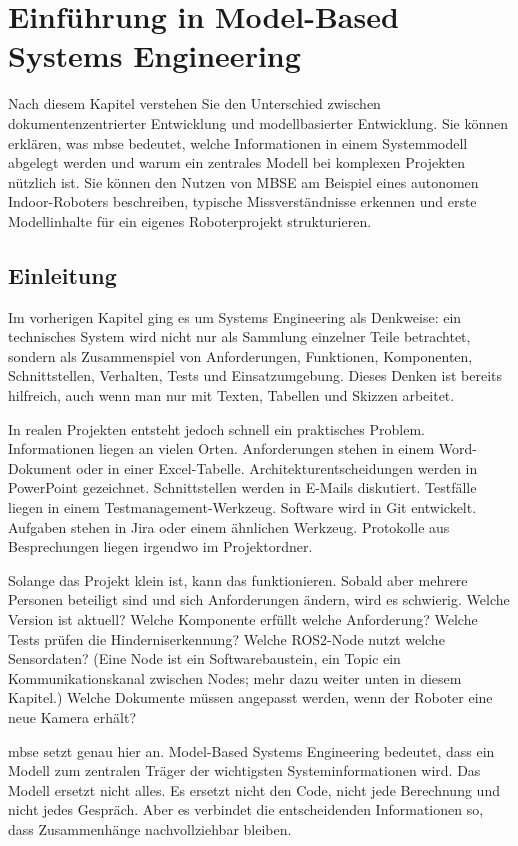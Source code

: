 \chapter{Einführung in Model-Based Systems Engineering}

\begin{lernziele}
Nach diesem Kapitel verstehen Sie den Unterschied zwischen dokumentenzentrierter Entwicklung und modellbasierter Entwicklung. Sie können erklären, was \gls{mbse} bedeutet, welche Informationen in einem Systemmodell abgelegt werden und warum ein zentrales Modell bei komplexen Projekten nützlich ist. Sie können den Nutzen von MBSE am Beispiel eines autonomen Indoor-Roboters beschreiben, typische Missverständnisse erkennen und erste Modellinhalte für ein eigenes Roboterprojekt strukturieren.
\end{lernziele}

\section{Einleitung}
Im vorherigen Kapitel ging es um Systems Engineering als Denkweise: ein technisches System wird nicht nur als Sammlung einzelner Teile betrachtet, sondern als Zusammenspiel von Anforderungen, Funktionen, Komponenten, Schnittstellen, Verhalten, Tests und Einsatzumgebung. Dieses Denken ist bereits hilfreich, auch wenn man nur mit Texten, Tabellen und Skizzen arbeitet.

In realen Projekten entsteht jedoch schnell ein praktisches Problem. Informationen liegen an vielen Orten. Anforderungen stehen in einem Word-Dokument oder in einer Excel-Tabelle. Architekturentscheidungen werden in PowerPoint gezeichnet. Schnittstellen werden in E-Mails diskutiert. Testfälle liegen in einem Testmanagement-Werkzeug. Software wird in Git entwickelt. Aufgaben stehen in Jira oder einem ähnlichen Werkzeug. Protokolle aus Besprechungen liegen irgendwo im Projektordner.

Solange das Projekt klein ist, kann das funktionieren. Sobald aber mehrere Personen beteiligt sind und sich Anforderungen ändern, wird es schwierig. Welche Version ist aktuell? Welche Komponente erfüllt welche Anforderung? Welche Tests prüfen die Hinderniserkennung? Welche ROS2-Node nutzt welche Sensordaten? (Eine Node ist ein Softwarebaustein, ein Topic ein Kommunikationskanal zwischen Nodes; mehr dazu weiter unten in diesem Kapitel.) Welche Dokumente müssen angepasst werden, wenn der Roboter eine neue Kamera erhält?

\gls{mbse} setzt genau hier an. Model-Based Systems Engineering bedeutet, dass ein Modell zum zentralen Träger der wichtigsten Systeminformationen wird. Das Modell ersetzt nicht alles. Es ersetzt nicht den Code, nicht jede Berechnung und nicht jedes Gespräch. Aber es verbindet die entscheidenden Informationen so, dass Zusammenhänge nachvollziehbar bleiben.

